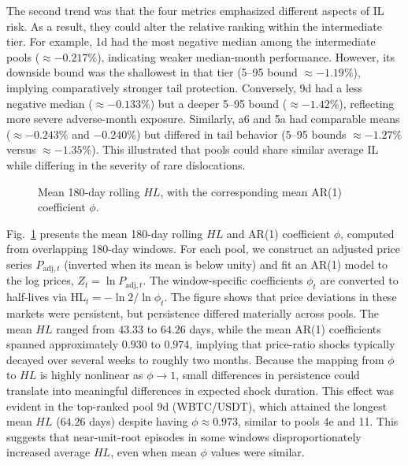 \documentclass[journal]{IEEEtran}
\begin{document}
The second trend was that the four metrics emphasized different aspects of IL risk. 
As a result, they could alter the relative ranking within the intermediate tier. 
For example, 1d had the most negative median among the intermediate pools ($\approx-0.217\%$), indicating weaker median-month performance. 
However, its downside bound was the shallowest in that tier (5--95 bound $\approx-1.19\%$), implying comparatively stronger tail protection. 
Conversely, 9d had a less negative median ($\approx-0.133\%$) but a deeper 5--95 bound ($\approx-1.42\%$), reflecting more severe adverse-month exposure. 
Similarly, a6 and 5a had comparable means ($\approx-0.243\%$ and $-0.240\%$) but differed in tail behavior (5--95 bounds $\approx-1.27\%$ versus $\approx-1.35\%$). 
This illustrated that pools could share similar average IL while differing in the severity of rare dislocations.


\begin{figure}[b]
\centering
\resizebox{0.5\textwidth}{!}{%
        
    }
\caption{Mean 180-day rolling $HL$, with the corresponding mean AR(1) coefficient $\phi$.}
\label{fig:half_life_180d_mean_phi_inside}
\end{figure}

Fig.~\ref{fig:half_life_180d_mean_phi_inside} presents the mean 180-day rolling $HL$ and AR(1) coefficient $\phi$, computed from overlapping 180-day windows. 
For each pool, we construct an adjusted price series $P_{\text{adj},t}$ (inverted when its mean is below unity) and fit an AR(1) model to the log prices, $Z_t=\ln P_{\text{adj},t}$. 
The window-specific coefficients $\phi_t$ are converted to half-lives via $\mathrm{HL}_t=-\ln 2 / \ln \phi_t$.
The figure shows that price deviations in these markets were persistent, but persistence differed materially across pools. 
The mean $HL$ ranged from $43.33$ to $64.26$ days, while the mean AR(1) coefficients spanned approximately $0.930$ to $0.974$, implying that price-ratio shocks typically decayed over several weeks to roughly two months. 
Because the mapping from $\phi$ to $HL$ is highly nonlinear as $\phi\to 1$, small differences in persistence could translate into meaningful differences in expected shock duration.
This effect was evident in the top-ranked pool 9d (WBTC/USDT), which attained the longest mean $HL$ ($64.26$ days) despite having $\phi\approx0.973$, similar to pools 4e and 11. 
This suggests that near-unit-root episodes in some windows disproportionately increased average $HL$, even when mean $\phi$ values were similar.
\end{document}
